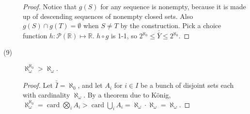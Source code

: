 \documentclass[12pt]{article}
\DeclareMathOperator{\wcard}{card}
\newcommand{\card}[1]{\bar{\bar{#1}}}
\newcommand{\power}[1]{\mathcal{P}(#1)}
\begin{document}
\begin{description}
\begin{proof}
	Notice that $g(S)$ for any sequence is nonempty, because it is made
	up of descending sequences of nonempty closed sets.  Also $g(S) \cap
	g(T) = \emptyset$ when $S \ne T$ by the construction. Pick a choice
	function $h: \power{\mathbb{R}} \mapsto \mathbb{R}$.  $h \circ g$ is
	1-1, so $2^{\aleph_0} \le \card{Y} \le 2^{\aleph_0}$.
  \end{proof}

\item[(9)]
  $\aleph_\omega^{\aleph_0} > \aleph_\omega$.
  \begin{proof}
    Let $\card{I} = \aleph_0$, and let $A_i$ for $i \in I$ be a bunch of
	disjoint sets each with cardinality $\aleph_\omega$.
	By a theorem due to K\"onig, $\aleph_\omega^{\aleph_0} = 
	\wcard{\bigotimes\limits_{i}{A_i}} > 
	\wcard{\bigcup\limits_{i}{A_i}} = \aleph_\omega \cdot
	\aleph_\omega = \aleph_\omega$.
  \end{proof}

\end{description}
\end{document}
